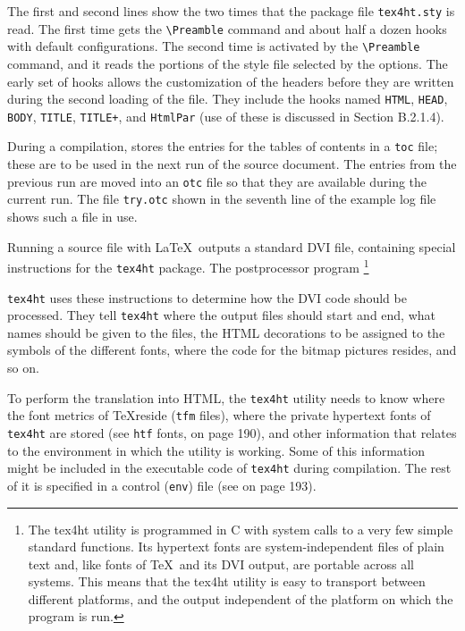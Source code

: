 The first and second lines show the two times that the package file
\verb|tex4ht.sty| is read. The first time gets the \verb|\Preamble|
command and about half a dozen hooks with default configurations. The
second time is activated by the \verb|\Preamble| command, and it reads
the portions of the style file selected by the options. The early set of
hooks allows the customization of the headers before they are written
during the second loading of the file. They include the hooks named
\verb|HTML|, \verb|HEAD|, \verb|BODY|, \verb|TITLE|, \verb|TITLE+|, and
\verb|HtmlPar| (use of these is discussed in Section B.2.1.4). 

During a compilation, \texht stores the entries for the tables of
contents in a \verb|toc| file; these are to be used in the next run of
the source document. The entries from the previous run are moved into an
\verb|otc| file so that they are available during the current run. The
file \verb|try.otc| shown in the seventh line of the example log file
shows such a file in use. 


Running a source file with \LaTeX\  outputs a standard DVI file,
containing special instructions for the \verb|tex4ht| package. The
postprocessor program 
\ifx\HCode\undefined%
\footnote{%
The tex4ht utility is programmed in C with system calls to a very few
simple standard functions. Its hypertext fonts are system-independent
files of plain text and, like fonts of \TeX\  and its DVI output, are
portable across all systems. This means that the tex4ht utility is easy
to transport between different platforms, and the output independent of
the platform on which the program is run. 
}%
\else%
\fi%

\verb|tex4ht| uses these instructions to determine how the DVI code should be
processed. They tell \verb|tex4ht| where the output files should start
and end, what names should be given to the files, 
the HTML decorations to be assigned to the symbols of the different fonts, where 
the code for the bitmap pictures resides, and so on. 

To perform the translation into HTML, the \verb|tex4ht| utility needs to
know where the font metrics of  \TeX reside (\verb|tfm| files), where
the private hypertext fonts of \verb|tex4ht| are stored (see \verb|htf|
fonts,  on page 190), and other information that relates to
the environment in which the utility is working. Some of this
information might be included in the executable code of \verb|tex4ht|
during compilation.  The rest of it is specified in a control
(\verb|env|) file (see  on page 193). 

